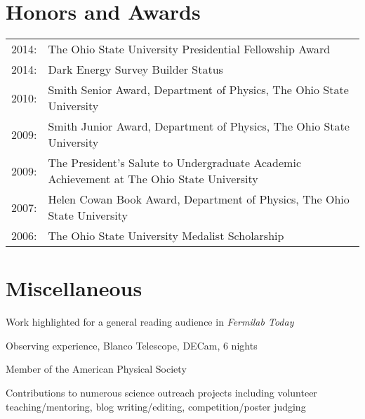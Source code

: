 \documentclass[12pt,a4paper,sans]{moderncv}	%
\begin{document}
\section{Honors and Awards}
\begin{tabularx}{\linewidth}{l X}
2014: & The Ohio State University Presidential Fellowship Award \\
2014: & Dark Energy Survey Builder Status \\
2010: & Smith Senior Award, Department of Physics, The Ohio State University \\
2009: & Smith Junior Award, Department of Physics, The Ohio State University  \\
2009: & The President's Salute to Undergraduate Academic Achievement at The Ohio State University \\
2007: & Helen Cowan Book Award, Department of Physics, The Ohio State University  \\
2006: & The Ohio State University Medalist Scholarship
\end{tabularx}

\section{Miscellaneous}
\begin{achievements}
\item Work highlighted for a general reading audience in \textit{Fermilab Today}
\item Observing experience, Blanco Telescope, DECam, 6 nights
\item Member of the American Physical Society
\item Contributions to numerous science outreach projects including volunteer teaching/mentoring, blog writing/editing, competition/poster judging
\end{achievements}

\end{document}
